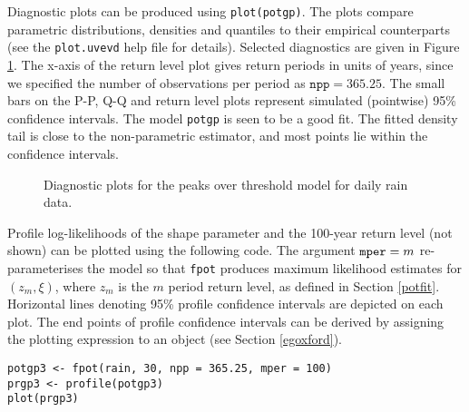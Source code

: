 \documentclass[11pt,a4paper]{article}
\begin{document}
Diagnostic plots can be produced using \verb+plot(potgp)+. 
The plots compare parametric distributions, densities and quantiles to their empirical counterparts (see the \verb+plot.uvevd+ help file for details).
Selected diagnostics are given in Figure \ref{potdiag}.
The x-axis of the return level plot gives return periods in units of years, since we specified the number of observations per period as $\texttt{npp} = 365.25$.
The small bars on the P-P, Q-Q and return level plots represent simulated (pointwise) 95\% confidence intervals.
The model \verb+potgp+ is seen to be a good fit. 
The fitted density tail is close to the non-parametric estimator, and most points lie within the confidence intervals.

\begin{figure}
\begin{center}
\vspace{-1.5cm}
\hspace{0cm} 
\hspace{0cm}
\end{center} 
\caption{Diagnostic plots for the peaks over threshold model for daily rain data.}
\label{potdiag}
\end{figure}

Profile log-likelihoods of the shape parameter and the 100-year return level (not shown) can be plotted using the following code. The argument $\verb+mper+ = m$ re-parameterises the model so that \verb+fpot+ produces maximum likelihood estimates for $(z_m,\xi)$, where $z_m$ is the $m$ period return level, as defined in Section \ref{potfit}. 
 Horizontal lines denoting 95\% profile confidence intervals are depicted on each plot. The end points of profile confidence intervals can be derived by assigning the plotting expression to an object (see Section \ref{egoxford}).
 
\begin{verbatim}
potgp3 <- fpot(rain, 30, npp = 365.25, mper = 100)
prgp3 <- profile(potgp3)
plot(prgp3)
\end{verbatim}

\end{document}
